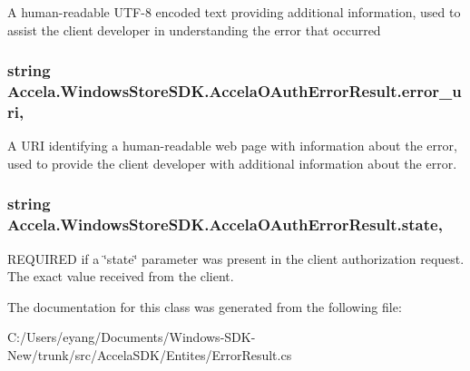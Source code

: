 A human-\/readable U\+T\+F-\/8 encoded text providing additional information, used to assist the client developer in understanding the error that occurred 

\hypertarget{class_accela_1_1_windows_store_s_d_k_1_1_accela_o_auth_error_result_ac80f86c37341859521bc4ffd57cadb12}{
\subsubsection[{error\+\_\+uri}]{\setlength{\rightskip}{0pt plus 5cm}string Accela.\+Windows\+Store\+S\+D\+K.\+Accela\+O\+Auth\+Error\+Result.\+error\+\_\+uri\hspace{0.3cm}{\ttfamily [get]}, {\ttfamily [set]}}}\label{class_accela_1_1_windows_store_s_d_k_1_1_accela_o_auth_error_result_ac80f86c37341859521bc4ffd57cadb12}


A U\+R\+I identifying a human-\/readable web page with information about the error, used to provide the client developer with additional information about the error. 

\hypertarget{class_accela_1_1_windows_store_s_d_k_1_1_accela_o_auth_error_result_ace9b1b641ff06f7ece69a0af8309134c}{
\subsubsection[{state}]{\setlength{\rightskip}{0pt plus 5cm}string Accela.\+Windows\+Store\+S\+D\+K.\+Accela\+O\+Auth\+Error\+Result.\+state\hspace{0.3cm}{\ttfamily [get]}, {\ttfamily [set]}}}\label{class_accela_1_1_windows_store_s_d_k_1_1_accela_o_auth_error_result_ace9b1b641ff06f7ece69a0af8309134c}


R\+E\+Q\+U\+I\+R\+E\+D if a \char`\"{}state\char`\"{} parameter was present in the client authorization request. The exact value received from the client. 



The documentation for this class was generated from the following file\+:\begin{DoxyCompactItemize}
\item 
C\+:/\+Users/eyang/\+Documents/\+Windows-\/\+S\+D\+K-\/\+New/trunk/src/\+Accela\+S\+D\+K/\+Entites/Error\+Result.\+cs\end{DoxyCompactItemize}
